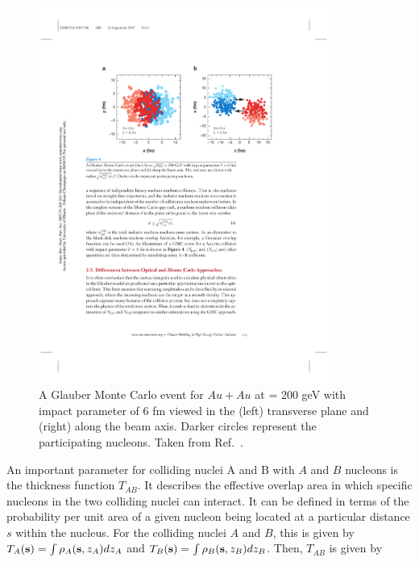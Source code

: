 \begin{figure}[htbp]
\begin{center}
\includegraphics[width=0.85\textwidth]{figures/theory/glauberMC}
\caption{A Glauber Monte Carlo event for $Au+Au$ at \sqrtsnn = 200 geV with impact parameter of 6 fm viewed in the (left) transverse plane and (right) along the beam axis.
Darker circles represent the participating nucleons.
Taken from Ref.~\cite{doi:10.1146/annurev.nucl.57.090506.123020}.}
\label{fig:glauberMC}
\end{center}
\end{figure}



An important parameter for colliding nuclei A and B with $A$ and $B$ nucleons is the thickness function $T_{AB}$.
It describes the effective overlap area in which specific nucleons in the two colliding nuclei can interact.
It can be defined in terms of the probability per unit area of a given nucleon being located at a particular distance $s$ within the nucleus.
For the colliding nuclei $A$ and $B$, this is given by $T_{A}({\bf{s}}) = \int \rho_A ({\bf{s}}, z_A) dz_{A}$ and $T_{B}({\bf{s}}) = \int \rho_B ({\bf{s}}, z_B) dz_{B}$.
Then, $T_{AB}$ is given by

